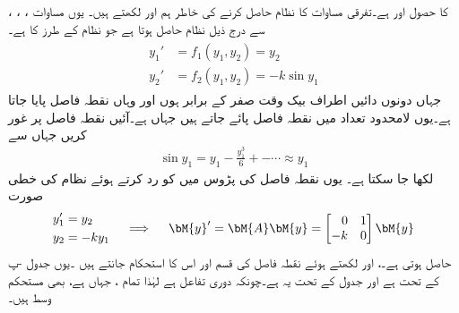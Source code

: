   ، ، ،  کا حصول  اور  ہے۔تفرقی مساوات کا نظام حاصل کرنے کی خاطر ہم  اور  لکھتے ہیں۔ یوں مساوات  سے درج ذیل نظام حاصل ہوتا ہے جو  نظام  کے طرز کا ہے۔
\begin{gather}\label{مساوات_نظام_غیر_خطی_ترکیب_مرحلہ_ٹ}
\begin{aligned}
y_1'&=f_1(y_1,y_2)=y_2\\
y_2'&=f_2(y_1,y_2)=-k\sin y_1
\end{aligned}
\end{gather}
جہاں دونوں دائیں اطراف بیک وقت صفر کے برابر ہوں  اور  وہاں نقطہ فاصل پایا جاتا ہے۔یوں لامحدود تعداد میں نقطہ فاصل  پائے جاتے ہیں جہاں  ہے۔آئیں نقطہ فاصل  پر غور کریں جہاں  سے
\begin{align*}
\sin y_1=y_1-\frac{y_1^3}{6}+-\cdots \approx y_1
\end{align*}
لکھا جا سکتا ہے۔ یوں نقطہ فاصل کی پڑوس میں  کو رد کرتے ہوئے  نظام  کی خطی صورت
\begin{gather}
\begin{aligned}
y_1'&=y_2\\
y_2&=-ky_1
\end{aligned}\quad \implies \quad
\begin{aligned}
\bM{y}'=\bM{A} \bM{y}=\begin{bmatrix*}[r] 0&1\\-k&0 \end{bmatrix*}\bM{y}
\end{aligned}
\end{gather}
حاصل ہوتی ہے۔،  اور  لکھتے ہوئے نقطہ فاصل کی قسم اور اس کا استحکام جانتے ہیں ۔یوں جدول -پ کے تحت   ہے اور جدول  کے تحت یہ   ہے۔چونکہ  دوری تفاعل ہے لہٰذا تمام ، جہاں  ہے،  بھی مستحکم وسط ہیں۔ 
 
